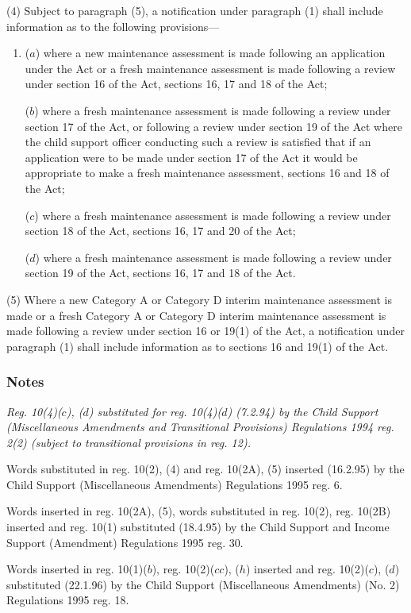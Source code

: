 \documentclass[a4paper]{article}
\newcommand\amendment[1]{\subsubsection*{Notes}{\itshape\frenchspacing\footnotesize #1 \par}}
\begin{document}
(4) 
Subject to paragraph (5), a notification under paragraph (1)  %
shall include information as to the following provisions—
\begin{enumerate}\item[]
($a$) where a new maintenance assessment is made following an application under the Act or a fresh maintenance assessment is made following a review under section 16 of the Act, sections 16, 17 and 18 of the Act;

($b$) where a fresh maintenance assessment is made following a review under section 17 of the Act, or following a review under section 19 of the Act where the child support officer conducting such a review is satisfied that if an application were to be made under section 17 of the Act it would be appropriate to make a fresh maintenance assessment, sections 16 and 18 of the Act;


($c$) where a fresh maintenance assessment is made following a review under section 18 of the Act, sections 16, 17 and 20 of the Act;

($d$) where a fresh maintenance assessment is made following a review under section 19 of the Act, sections 16, 17 and 18 of the Act.
\end{enumerate}

(5) Where a new Category A 
or Category D  %
interim maintenance assessment is made or a fresh Category A 
or Category D  %
interim maintenance assessment is made following a review under section 16 or 19(1) of the Act, a notification under paragraph (1) shall include information as to sections 16 and 19(1) of the Act.

\amendment{
Reg. 10(4)($c$), ($d$) substituted for reg. 10(4)($d$) (7.2.94) by the Child Support (Miscellaneous Amendments and Transitional Provisions) Regulations 1994 reg. 2(2) (subject to transitional provisions in reg. 12).

Words substituted in reg. 10(2), (4) and reg. 10(2A), (5) inserted (16.2.95) by the Child Support (Miscellaneous Amendments) Regulations 1995 reg. 6.

Words inserted in reg. 10(2A), (5), words substituted in reg. 10(2), reg. 10(2B) inserted and reg. 10(1) substituted (18.4.95) by the Child Support and Income Support (Amendment) Regulations 1995 reg. 30.

Words inserted in reg. 10(1)($b$), reg. 10(2)($cc$), ($h$) inserted and reg. 10(2)($c$), ($d$) substituted (22.1.96) by the Child Support (Miscellaneous Amendments) (No. 2) Regulations 1995 reg. 18.
}
\end{document}
